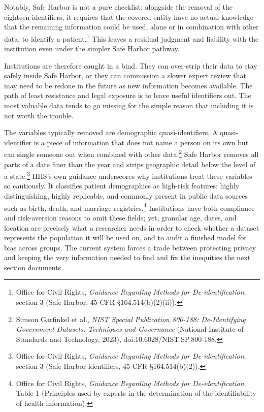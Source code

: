 \documentclass[11pt]{article}
\begin{document}
Notably, Safe Harbor is not a pure checklist: alongside the removal of the eighteen identifiers, it requires that the covered entity have no actual knowledge that the remaining information could be used, alone or in combination with other data, to identify a patient.\footnote{Office for Civil Rights, \textit{Guidance Regarding Methods for De-identification}, section 3 (Safe Harbor, 45 CFR \S164.514(b)(2)(ii)).} This leaves a residual judgment and liability with the institution even under the simpler Safe Harbor pathway.

Institutions are therefore caught in a bind. They can over-strip their data to stay safely inside Safe Harbor, or they can commission a slower expert review that may need to be redone in the future as new information becomes available.
The path of least resistance and legal exposure is to leave useful identifiers out. The most valuable data tends to go missing for the simple reason that including it is not worth the trouble.

The variables typically removed are demographic quasi-identifiers. A quasi-identifier is a piece of information that does not name a person on its own but can single someone out when combined with other data.\footnote{Simson Garfinkel et al., \textit{NIST Special Publication 800-188: De-Identifying Government Datasets: Techniques and Governance} (National Institute of Standards and Technology, 2023), doi:10.6028/NIST.SP.800-188.} Safe Harbor removes all parts of a date finer than the year and strips geographic detail below the level of a state.\footnote{Office for Civil Rights, \textit{Guidance Regarding Methods for De-identification}, section 3 (Safe Harbor identifiers, 45 CFR \S164.514(b)(2)).} HHS's own guidance underscores why institutions treat these variables so cautiously. It classifies patient demographics as high-risk features: highly distinguishing, highly replicable, and commonly present in public data sources such as birth, death, and marriage registries.\footnote{Office for Civil Rights, \textit{Guidance Regarding Methods for De-identification}, Table 1 (Principles used by experts in the determination of the identifiability of health information).} Institutions have both compliance and risk-aversion reasons to omit these fields; yet, granular age, dates, and location are precisely what a researcher needs in order to check whether a dataset represents the population it will be used on, and to audit a finished model for bias across groups. The current system forces a trade between protecting privacy and keeping the very information needed to find and fix the inequities the next section documents.
\end{document}
